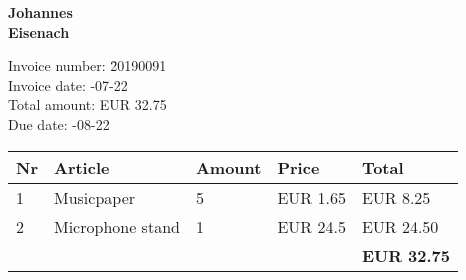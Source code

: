 \documentclass[a4paper]{article}
\begin{document}
\noindent\textbf{Johannes\\Eisenach}

\vspace{8mm}



\begin{tabbing}
Invoice number: \= 20190091 \\
Invoice date:   -07-22 \\
Total amount:   \> EUR 32.75 \\
Due date:       -08-22 \\
\end{tabbing}

\begin{tabular}{lp{30mm}ll|l}\\ \hline
{\bfseries Nr} &
{\bfseries Article} &
{\bfseries Amount} &
{\bfseries Price} &
{\bfseries Total} \\ \hline\hline
1 &Musicpaper &5 &EUR 1.65 &EUR 8.25 \\2 &Microphone stand &1 &EUR 24.5 &EUR 24.50\\\hline
 & & & & \textbf{EUR 32.75} \\
\end{tabular}
\end{document}
